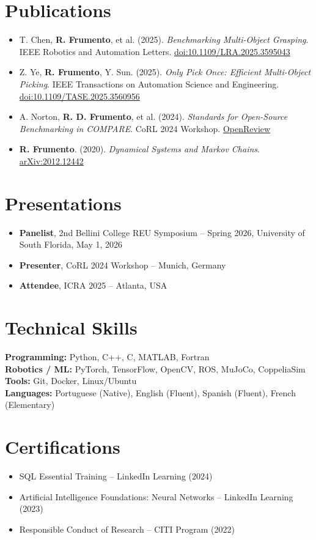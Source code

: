 \documentclass[a4paper,10pt]{article}
\begin{document}
\section*{Publications}
\begin{itemize}
    \item T. Chen, \textbf{R. Frumento}, et al. (2025). \emph{Benchmarking Multi-Object Grasping}. IEEE Robotics and Automation Letters. \href{https://doi.org/10.1109/LRA.2025.3595043}{doi:10.1109/LRA.2025.3595043}
    \item Z. Ye, \textbf{R. Frumento}, Y. Sun. (2025). \emph{Only Pick Once: Efficient Multi-Object Picking}. IEEE Transactions on Automation Science and Engineering. \href{https://ieeexplore.ieee.org/document/10965785}{doi:10.1109/TASE.2025.3560956}
    \item A. Norton, \textbf{R. D. Frumento}, et al. (2024). \emph{Standards for Open-Source Benchmarking in COMPARE}. CoRL 2024 Workshop. \href{https://openreview.net/forum?id=eDRxok2gvr}{OpenReview}
    \item \textbf{R. Frumento}. (2020). \emph{Dynamical Systems and Markov Chains}. \href{https://arxiv.org/abs/2012.12442}{arXiv:2012.12442}
\end{itemize}

\section*{Presentations}
\begin{itemize}
    \item \textbf{Panelist}, 2nd Bellini College REU Symposium -- Spring 2026, University of South Florida, May 1, 2026
    \item \textbf{Presenter}, CoRL 2024 Workshop -- Munich, Germany
    \item \textbf{Attendee}, ICRA 2025 -- Atlanta, USA
\end{itemize}

\section*{Technical Skills}
\textbf{Programming:} Python, C++, C, MATLAB, Fortran \\
\textbf{Robotics / ML:} PyTorch, TensorFlow, OpenCV, ROS, MuJoCo, CoppeliaSim \\
\textbf{Tools:} Git, Docker, Linux/Ubuntu \\
\textbf{Languages:} Portuguese (Native), English (Fluent), Spanish (Fluent), French (Elementary)

\section*{Certifications}
\begin{itemize}
    \item SQL Essential Training -- LinkedIn Learning (2024)
    \item Artificial Intelligence Foundations: Neural Networks -- LinkedIn Learning (2023)
    \item Responsible Conduct of Research -- CITI Program (2022)
\end{itemize}
\end{document}
